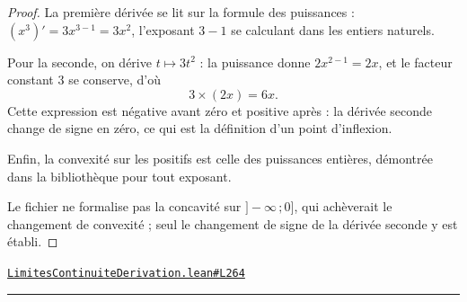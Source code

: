 \documentclass[11pt,a4paper]{article}
\theoremstyle{definition}
\theoremstyle{plain}
\newcommand{\source}[2]{\par\smallskip\noindent\hfill{\footnotesize\href{#1}{\texttt{#2}}}\par\smallskip}
\begin{document}
\begin{proof}
La première dérivée se lit sur la formule des puissances : $(x^{3})' = 3x^{3-1} = 3x^{2}$,
l'exposant $3 - 1$ se calculant dans les entiers naturels.

Pour la seconde, on dérive $t \mapsto 3t^{2}$ : la puissance donne $2x^{2-1} = 2x$, et le
facteur constant $3$ se conserve, d'où
\[ 3 \times (2x) = 6x . \]
Cette expression est négative avant zéro et positive après : la dérivée seconde change de
signe en zéro, ce qui est la définition d'un point d'inflexion.

Enfin, la convexité sur les positifs est celle des puissances entières, démontrée dans la
bibliothèque pour tout exposant.

\medskip\noindent
Le fichier ne formalise pas la concavité sur $]-\infty\,;0]$, qui achèverait le
changement de convexité ; seul le changement de signe de la dérivée seconde y est établi.
\end{proof}
\source{https://github.com/Commutator-IO/learn-lean/blob/main/courses/02-lycee/04-limites-continuite-derivation/LimitesContinuiteDerivation.lean\#L264}{LimitesContinuiteDerivation.lean\#L264}

\vfill
\noindent\rule{0.35\linewidth}{0.4pt}\par
{}
\end{document}
